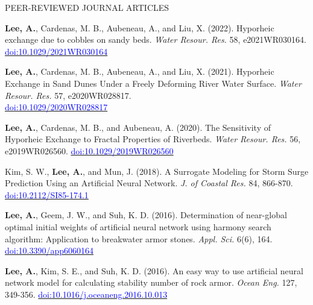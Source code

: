 \documentclass{resume_anzy} %
\begin{document}
\begin{rSection}{PEER-REVIEWED JOURNAL ARTICLES}
\item [6] \textbf{Lee, A.}, Cardenas, M. B., Aubeneau, A., and Liu, X. (2022). Hyporheic exchange due to cobbles on sandy beds. \textit{Water Resour. Res.} 58, e2021WR030164. \href{https://doi.org/10.1029/2021WR030164}{\textcolor{blue}{doi:10.1029/2021WR030164}}

\item [7] \textbf{Lee, A.}, Cardenas, M. B., Aubeneau, A., and Liu, X. (2021). Hyporheic Exchange in Sand Dunes Under a Freely Deforming River Water Surface. \textit{Water Resour. Res.} 57, e2020WR028817. \\ \href{https://doi.org/10.1029/2020WR028817}{\textcolor{blue}{doi:10.1029/2020WR028817}}

\item [8] \textbf{Lee, A.}, Cardenas, M. B., and Aubeneau, A.  (2020). The Sensitivity of Hyporheic Exchange to Fractal Properties of Riverbeds. \textit{Water Resour. Res.} 56, e2019WR026560. \href{https://doi.org/10.1029/2019WR026560}{\textcolor{blue}{doi:10.1029/2019WR026560}}

\item [9] Kim, S. W., \textbf{Lee, A.}, and Mun, J. (2018). A Surrogate Modeling for Storm Surge Prediction Using an Artificial Neural Network. \textit{J. of Coastal Res.} 84, 866-870. \href{https://doi.org/10.2112/SI85-174.1}{\textcolor{blue}{doi:10.2112/SI85-174.1}}

\item [10] \textbf{Lee, A.}, Geem, J. W., and Suh, K. D. (2016). Determination of near-global optimal initial weights of artificial neural network using harmony search algorithm: Application to breakwater armor stones. \textit{Appl. Sci.} 6(6), 164. \href{https://doi.org/10.3390/app6060164}{\textcolor{blue}{doi:10.3390/app6060164}}

\item [11] \textbf{Lee, A.}, Kim, S. E., and Suh, K. D. (2016). An easy way to use artificial neural network model for calculating stability number of rock armor. \textit{Ocean Eng.} 127, 349-356.  \href{https://doi.org/10.1016/j.oceaneng.2016.10.013}{\textcolor{blue}{doi:10.1016/j.oceaneng.2016.10.013}}
\end{rSection}

\end{document}
